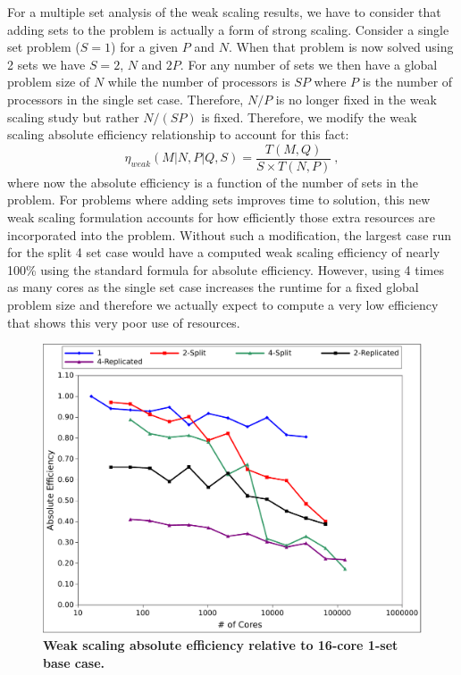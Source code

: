 For a multiple set analysis of the weak scaling results, we have to
consider that adding sets to the problem is actually a form of strong
scaling. Consider a single set problem ($S=1$) for a given $P$ and
$N$. When that problem is now solved using 2 sets we have $S=2$, $N$
and $2P$. For any number of sets we then have a global problem size of
$N$ while the number of processors is $SP$ where $P$ is the number of
processors in the single set case. Therefore, $N/P$ is no longer fixed
in the weak scaling study but rather $N/(SP)$ is fixed. Therefore, we
modify the weak scaling absolute efficiency relationship to account
for this fact:
\begin{equation}
\eta_{weak}(M|N,P|Q,S) = \frac{T(M,Q)}{S \times T(N,P)}\:,
  \label{eq:ms_weak_efficiency}
\end{equation}
where now the absolute efficiency is a function of the number of sets
in the problem. For problems where adding sets improves time to
solution, this new weak scaling formulation accounts for how
efficiently those extra resources are incorporated into the
problem. Without such a modification, the largest case run for the
split 4 set case would have a computed weak scaling efficiency of
nearly 100\% using the standard formula for absolute
efficiency. However, using 4 times as many cores as the single set
case increases the runtime for a fixed global problem size and
therefore we actually expect to compute a very low efficiency that
shows this very poor use of resources.

\begin{figure}[t!]
  \begin{center}
    \includegraphics[width=6in]{chapters/parallel_mc/titan_weak_ms_eff.pdf}
  \end{center}
  \caption{\textbf{Weak scaling absolute efficiency relative to
      16-core 1-set base case.}}
  \label{fig:titan_weak_ms_eff}
\end{figure}

